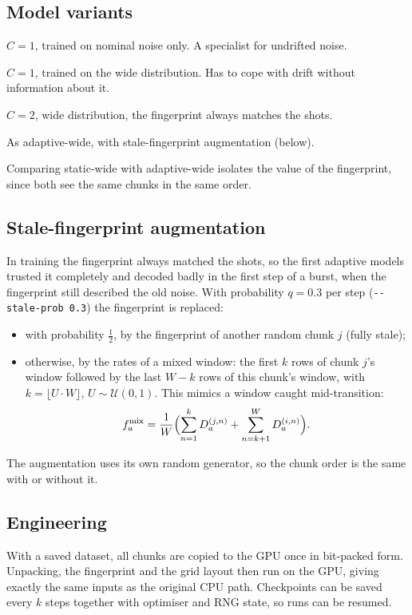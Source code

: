 \documentclass[11pt,a4paper]{article}
\newcommand{\code}[1]{\texttt{#1}}
\begin{document}
\subsection{Model variants}
\begin{description}[leftmargin=1.2em, labelindent=0em]
\item[static-nominal] $C=1$, trained on nominal noise only. A specialist for undrifted noise.
\item[static-wide] $C=1$, trained on the wide distribution. Has to cope with drift without information about it.
\item[adaptive-wide] $C=2$, wide distribution, the fingerprint always matches the shots.
\item[adaptive-stale] As adaptive-wide, with stale-fingerprint augmentation (below).
\end{description}
Comparing static-wide with adaptive-wide isolates the value of the fingerprint, since both see the same
chunks in the same order.

\subsection{Stale-fingerprint augmentation}
In training the fingerprint always matched the shots, so the first adaptive models trusted it completely
and decoded badly in the first step of a burst, when the fingerprint still described the old noise.
With probability $q=0.3$ per step (\code{-{}-stale-prob 0.3}) the fingerprint is replaced:
\begin{itemize}
  \item with probability $\tfrac12$, by the fingerprint of another random chunk $j$ (fully stale);
  \item otherwise, by the rates of a mixed window: the first $k$ rows of chunk $j$'s window followed by
        the last $W-k$ rows of this chunk's window, with $k = \lfloor U\cdot W\rfloor$, $U\sim\mathcal U(0,1)$.
        This mimics a window caught mid-transition:
        \begin{equation}
          f^{\mathrm{mix}}_a = \frac{1}{W}\Bigl(\sum_{n=1}^{k} D^{(j,n)}_a + \sum_{n=k+1}^{W} D^{(i,n)}_a\Bigr).
        \end{equation}
\end{itemize}
The augmentation uses its own random generator, so the chunk order is the same with or without it.

\subsection{Engineering}
With a saved dataset, all chunks are copied to the GPU once in bit-packed form. Unpacking, the fingerprint
and the grid layout then run on the GPU, giving exactly the same inputs as the original CPU path. Checkpoints
can be saved every $k$ steps together with optimiser and RNG state, so runs can be resumed.
\end{document}
